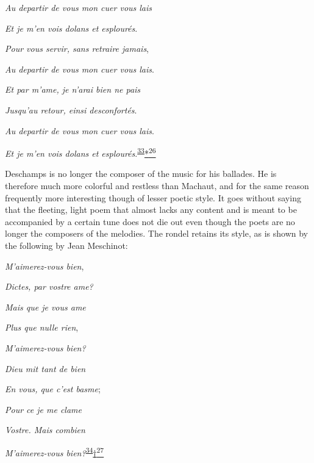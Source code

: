 \emph{\protect\hypertarget{21_Chapter_Thirteen__IMAGE_AND_WORD.xhtmlux5cux23page_357}{}{}Au
departir de vous mon cuer vous lais}

\emph{Et je m'en vois dolans et esplourés}.

\emph{Pour vous servir, sans retraire jamais},

\emph{Au departir de vous mon cuer vous lais}.

\emph{Et par m'ame, je n'arai bien ne pais}

\emph{Jusqu'au retour, einsi desconfortés}.

\emph{Au departir de vous mon cuer vous lais}.

\emph{Et je m'en vois dolans et
esplourés}.\textsuperscript{\protect\hypertarget{21_Chapter_Thirteen__IMAGE_AND_WORD.xhtmlux5cux23id_244}{\protect\hyperlink{23_NOTES.xhtmlux5cux23id_245}{33}}}\protect\hypertarget{21_Chapter_Thirteen__IMAGE_AND_WORD.xhtmlux5cux23id_2745}{\protect\hyperlink{23_NOTES.xhtmlux5cux23id_2746}{*\textsuperscript{26}}}

Deschamps is no longer the composer of the music for his ballades. He is
therefore much more colorful and restless than Machaut, and for the same
reason frequently more interesting though of lesser poetic style. It
goes without saying that the fleeting, light poem that almost lacks any
content and is meant to be accompanied by a certain tune does not die
out even though the poets are no longer the composers of the melodies.
The rondel retains its style, as is shown by the following by Jean
Meschinot:

\emph{M'aimerez-vous bien},

\emph{Dictes, par vostre ame?}

\emph{Mais que je vous ame}

\emph{Plus que nulle rien},

\emph{M'aimerez-vous bien?}

\emph{Dieu mit tant de bien}

\emph{En vous, que c'est basme};

\emph{Pour ce je me clame}

\emph{Vostre. Mais combien}

\emph{M'aimerez-vous
bien?}\textsuperscript{\protect\hypertarget{21_Chapter_Thirteen__IMAGE_AND_WORD.xhtmlux5cux23id_242}{\protect\hyperlink{23_NOTES.xhtmlux5cux23id_243}{34}}}\protect\hypertarget{21_Chapter_Thirteen__IMAGE_AND_WORD.xhtmlux5cux23id_2747}{\protect\hyperlink{23_NOTES.xhtmlux5cux23id_2748}{†\textsuperscript{27}}}

